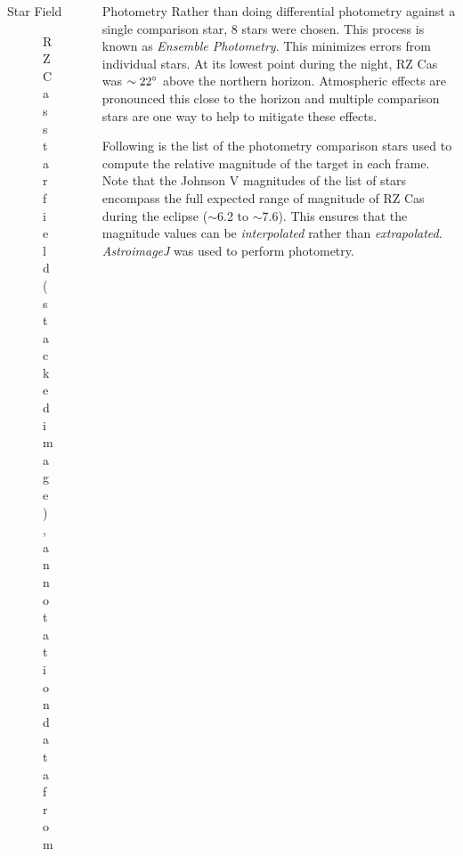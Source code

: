 \documentclass[final]{beamer}
\newlength{\sepwidth}
\newlength{\colwidth}
\newcommand{\separatorcolumn}{\begin{column}{\sepwidth}\end{column}}
\begin{document}
\begin{frame}[t]
\begin{columns}[t]
\begin{column}{\colwidth}
\begin{block}{Star Field}
    \begin{figure}
      \centering
        \caption{RZ Cas star field (stacked image), annotation data from \cite{2000A&AS..143....9W}}
    \end{figure}

  \end{block}

\end{column}

\separatorcolumn

\begin{column}{\colwidth}

  \begin{block}{Photometry}
    Rather than doing differential photometry against a single comparison star, 8 stars
    were chosen. This process is known as \textit{Ensemble Photometry}. This minimizes 
    errors from individual stars. At its lowest point during the night, RZ Cas was 
    $\sim22\degree$ above the northern horizon.
    Atmospheric effects are pronounced this close to the horizon and multiple comparison
    stars are one way to help to mitigate these effects.

    Following is the list of the photometry comparison stars used to compute the 
    relative magnitude of the target in each frame. Note that the Johnson V magnitudes 
    of the list of stars encompass the full expected range of magnitude of RZ Cas 
    during the eclipse ($\sim$6.2 to $\sim$7.6). This ensures that the magnitude 
    values can be \textit{interpolated} rather than \textit{extrapolated}. 
    \textit{AstroimageJ} was used to perform photometry.


\end{block}
\end{column}
\end{columns}
\end{frame}
\end{document}

